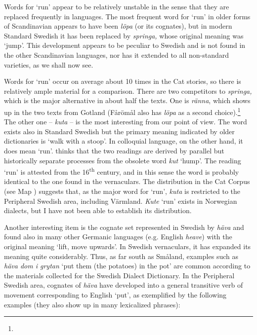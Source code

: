 \begin{styleBodytextC}
Words for ‘run’ appear to be relatively unstable in the sense that they are replaced frequently in languages. The most frequent word for ‘run’ in older forms of Scandinavian appears to have been \textit{löpa }(or its cognates), but in modern Standard Swedish it has been replaced by \textit{springa, }whose original meaning was ‘jump’. This development appears to be peculiar to Swedish and is not found in the other Scandinavian languages, nor has it extended to all non-standard varieties, as we shall now see. 

\end{styleBodytextC}

\begin{styleBodytextC}
Words for ‘run’ occur on average about 10 times in the Cat stories, so there is relatively ample material for a comparison. There are two competitors to \textit{springa, }which is the major alternative in about half the texts. One is \textit{ränna}, which shows up in the two texts from Gotland (Fårömål also has \textit{löpa} as a second choice).\footnote{} The other one – \textit{kuta} – is the most interesting from our point of view. The word exists also in Standard Swedish but the primary meaning indicated by older dictionaries is ‘walk with a stoop’. In colloquial language, on the other hand, it does mean ‘run’. \citet[371]{Hellquist1922} thinks that the two readings are derived by parallel but historically separate processes from the obsolete word \textit{kut} ‘hump’. The reading ‘run’ is attested from the 16\textsuperscript{th} century, and in this sense the word is probably identical to the one found in the vernaculars. The distribution in the Cat Corpus (see Map ) suggests that, as the major word for ‘run’, \textit{kuta} is restricted to the Peripheral Swedish area, including Värmland. \textit{Kute} ‘run’ exists in Norwegian dialects, but I have not been able to establish its distribution.

\end{styleBodytextC}

\begin{styleBodytextC}
Another interesting item is the cognate set represented in Swedish by \textit{häva} and found also in many other Germanic languages (e.g. English \textit{heave}) with the original meaning ‘lift, move upwards’. In Swedish vernaculars, it has expanded its meaning quite considerably. Thus, as far south as Småland, examples such as \textit{häva dom i grytan} ‘put them (the potatoes) in the pot’ are common according to the materials collected for the Swedish Dialect Dictionary. In the Peripheral Swedish area, cognates of \textit{häva} have developed into a general transitive verb of movement corresponding to English ‘put’, as exemplified by the following examples (they also show up in many lexicalized phrases):

\end{styleBodytextC}

